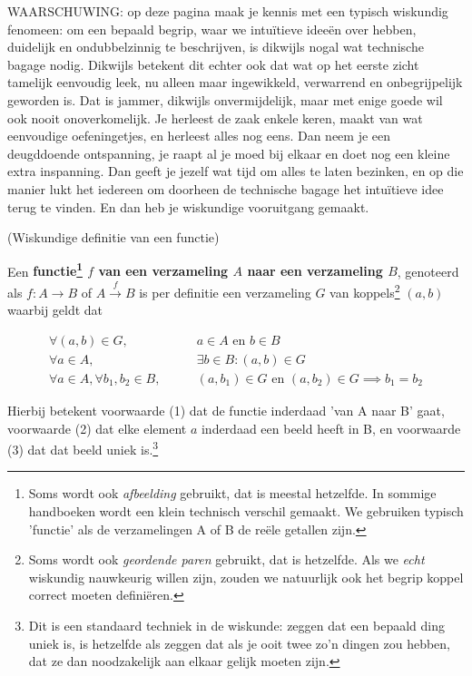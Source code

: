\documentclass{ximera}
\begin{document}
{\scriptsize 
	
	WAARSCHUWING: op deze pagina maak je kennis met een typisch wiskundig fenomeen: om een bepaald begrip, waar we intuïtieve ideeën over hebben,   duidelijk en ondubbelzinnig te beschrijven, is dikwijls nogal wat technische bagage nodig. Dikwijls betekent dit echter ook dat wat op het eerste zicht tamelijk eenvoudig leek, nu alleen maar ingewikkeld, verwarrend en onbegrijpelijk geworden is. Dat is jammer, dikwijls onvermijdelijk, maar met enige goede wil ook nooit onoverkomelijk. Je herleest de zaak enkele keren, maakt van wat eenvoudige oefeningetjes, en herleest alles nog eens. Dan neem je een deugddoende ontspanning, je raapt al je moed bij elkaar en doet nog een kleine extra inspanning. Dan geeft je jezelf wat tijd om alles te laten bezinken, en op die manier lukt het iedereen om doorheen de technische bagage het intuïtieve idee terug te vinden. En dan heb je wiskundige vooruitgang gemaakt.  

}

\begin{definition}  (Wiskundige definitie van een functie)
	  
Een \textbf{functie\footnote{Soms wordt ook \textit{afbeelding} gebruikt, dat is meestal hetzelfde. In sommige handboeken wordt een klein technisch verschil gemaakt. We gebruiken typisch 'functie' als de verzamelingen A of B de reële getallen zijn. } $f$  van een verzameling $A$ naar een verzameling $B$}, genoteerd als $f:A\rightarrow B$ of $A \overset{f}{\rightarrow} B$ is per definitie een verzameling $G$  van koppels\footnote{Soms wordt ook \textit{geordende paren} gebruikt, dat is hetzelfde. Als we \textit{echt} wiskundig nauwkeurig willen zijn, zouden we natuurlijk ook het begrip koppel correct moeten definiëren.} $(a,b)$ waarbij geldt dat

\begin{align}
\forall (a,b) \in G, \qquad & a\in A \text{ en } b\in B \\
\forall a \in A, \qquad & \exists  b \in B : (a,b) \in G \\
\forall a\in A, \forall b_1,b_2 \in B, \qquad  & (a,b_1) \in G \text{ en } (a,b_2) \in G \implies b_1 = b_2  
\end{align}

\end{definition}
Hierbij betekent voorwaarde (1) dat de functie inderdaad 'van A naar B' gaat, voorwaarde (2) dat elke element $a$ inderdaad een beeld heeft in B, en voorwaarde (3) dat dat beeld uniek is.\footnote{Dit is een standaard techniek in de wiskunde: zeggen dat een bepaald ding uniek is, is hetzelfde als zeggen dat als je ooit twee zo'n dingen zou hebben, dat ze dan noodzakelijk aan elkaar gelijk moeten zijn. }
\end{document}
